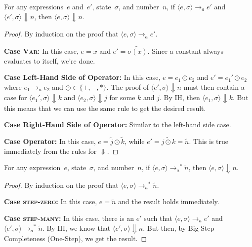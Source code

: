 \documentclass{lecturenotes}
\newcommand{\astep}{\ensuremath{\mathrel{\longrightarrow_a}}}
\begin{document}
\begin{lem}
  For any expressions~$e$ and~$e'$, state~$\sigma$, and number~$n$, if $\langle e, \sigma \rangle \astep e'$ and $\langle e', \sigma\rangle\Downarrow n$, then $\langle e, \sigma \rangle \Downarrow n$.
\end{lem}
\begin{proof}
  By induction on the proof that $\langle e, \sigma \rangle \astep e'$.

  \textbf{Case \textsc{Var}:}
  In this case, $e = x$ and $e' = \widetilde{\sigma(x)}$.
  Since a constant always evaluates to itself, we're done.

  \textbf{Case Left-Hand Side of Operator:}
  In this case, $e = e_1 \odot e_2$ and $e' = e_1' \odot e_2$ where $e_1 \astep e_2$ and $\odot \in \{+, -, \ast\}$.
  The proof of $\langle e', \sigma \rangle \Downarrow n$ must then contain a case for $\langle e_1', \sigma\rangle \Downarrow k$ and $\langle e_2, \sigma \rangle \Downarrow j$ for some $k$ and $j$.
  By IH, then $\langle e_1, \sigma \rangle \Downarrow k$.
  But this means that we can use the same rule to get the desired result.

  \textbf{Case Right-Hand Side of Operator:}
  Similar to the left-hand side case.

  \textbf{Case Operator:}
  In this case, $e = \tilde{j} \odot \tilde{k}$, while $e' = \widetilde{j \odot k} = \tilde{n}$.
  This is true immediately from the rules for $\Downarrow$.
\end{proof}

\begin{thm}
  For any expression~$e$, state~$\sigma$, and number~$n$, if $\langle e, \sigma\rangle \mathrel{\astep^\ast} \tilde{n}$, then $\langle e, \sigma \rangle \Downarrow n$.
\end{thm}
\begin{proof}
  By induction on the proof that $\langle e, \sigma\rangle \mathrel{\astep^\ast} \tilde{n}$.

  \noindent\textbf{Case \textsc{step-zero}:}
  In this case, $e = \tilde{n}$ and the result holds immediately.

  \noindent\textbf{Case \textsc{step-many}:}
  In this case, there is an $e'$ such that $\langle e, \sigma \rangle \astep e'$ and $\langle e', \sigma \rangle \mathrel{\astep^\ast} \tilde{n}$.
  By IH, we know that $\langle e', \sigma \rangle \Downarrow n$.
  But then, by Big-Step Completeness (One-Step), we get the result.
\end{proof}
\end{document}
